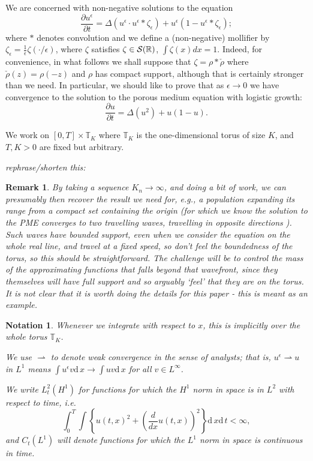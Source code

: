\documentclass[12pt]{article}
\newtheorem{remark}[theorem]{Remark}
\newtheorem{notation}[theorem]{Notation}
\newcommand{\IR}{\mathbb R}
\newcommand{\IT}{\mathbb T}
\newcommand{\dif}{\mathrm{d}\,}
\newcommand{\plr}[1]{\todo[inline]{Peter: #1}}
\newcommand{\comment}[1]{{\color{blue} \it #1}}
\begin{document}
\plr{This is from pme.tex.}

We are concerned with non-negative solutions to the equation
\begin{equation}
\label{mollified equation}
\frac{\partial u^\epsilon}{\partial t}=
\Delta\left(u^\epsilon \cdot u^\epsilon *\zeta_\epsilon\right)
+u^\epsilon\left(1-u^\epsilon*\zeta_\epsilon\right);
\end{equation}
where $*$ denotes convolution and we define
a (non-negative) mollifier by
$\zeta_\epsilon=\frac{1}{\epsilon}\zeta(\cdot/\epsilon)$, where $\zeta$
satisfies
$\zeta\in\cal{S}(\IR)$, $\int\zeta(x)dx=1$. Indeed, for convenience, in
what follows we shall suppose that $\zeta =\rho*\check{\rho}$ where
$\check{\rho}(z)=\rho(-z)$ and $\rho$ has
compact support, although that
is certainly stronger than we need.
In particular, we should like to prove that as $\epsilon\to 0$ we have
convergence to the solution to the porous medium equation with
logistic growth:
\begin{equation}
\label{PME}
\frac{\partial u}{\partial t}=
\Delta\left(u^2\right)
+u\left(1-u\right).
\end{equation}

We work on $[0,T]\times \IT_K$ where $\IT_K$ is the one-dimensional
torus of size $K$, and $T,K>0$ are fixed but arbitrary.

\comment{rephrase/shorten this:}

\begin{remark}
By taking a sequence $K_n\to\infty$, and doing a bit of work,
we can presumably then recover the result
we need for, e.g., a population expanding its range from a compact
set containing the origin (for which we know the solution to the PME
converges to two travelling waves, travelling in opposite directions
\cite{kamin/rosenau:2004}). Such waves have bounded support, even when
we consider the equation on
the whole real line, and travel at a fixed speed, so don't feel the boundedness
of the torus,
so this should be straightforward. The challenge will be to control the
mass of the approximating functions that falls beyond that wavefront,
since they themselves will have full support and so arguably `feel' that they
are on the torus.
It is not clear that it is worth doing the details for this paper - this is
meant as an example.
\end{remark}

\begin{notation}

Whenever we integrate with respect to $x$, this is implicitly over the
whole torus $\IT_K$.

We use $\rightharpoonup$ to denote weak convergence in the sense of analysts;
that is, $u^\epsilon\rightharpoonup u$ in $L^1$ means $\int u^\epsilon v \dif x
\rightarrow\int uv\dif x$ for all $v\in L^\infty$.

We write $L_t^2(H^1)$ for functions for which the $H^1$ norm in
space is in $L^2$ with respect to time, i.e.
$$\int_0^T\int \left\{u(t,x)^2+\left(\frac{d}{dx} u(t,x)\right)^2\right\} \dif x \dif t <\infty,$$
and $C_t(L^1)$
will denote functions for which the $L^1$ norm in space is continuous in time.
\end{notation}
\end{document}
